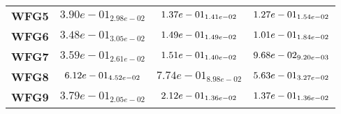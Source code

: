 \documentclass{article}
\begin{document}
\begin{table}[!htp]
\begin{scriptsize}
\begin{tabular}{c|ccc}
      \textbf{WFG5} & $3.90e-01_{2.98e-02} $ & $ \cellcolor{gray25} 1.37e-01_{1.41e-02} $ & $ \cellcolor{gray95} 1.27e-01_{1.54e-02}$ \\
      \textbf{WFG6} & $3.48e-01_{3.05e-02} $ & $ \cellcolor{gray25} 1.49e-01_{1.49e-02} $ & $ \cellcolor{gray95} 1.01e-01_{1.84e-02}$ \\
      \textbf{WFG7} & $3.59e-01_{2.61e-02} $ & $ \cellcolor{gray25} 1.51e-01_{1.40e-02} $ & $ \cellcolor{gray95} 9.68e-02_{9.20e-03}$ \\
      \textbf{WFG8} & $\cellcolor{gray25} 6.12e-01_{4.52e-02} $ & $ 7.74e-01_{8.98e-02} $ & $ \cellcolor{gray95} 5.63e-01_{3.27e-02}$ \\
      \textbf{WFG9} & $3.79e-01_{2.05e-02} $ & $ \cellcolor{gray25} 2.12e-01_{1.36e-02} $ & $ \cellcolor{gray95} 1.37e-01_{1.36e-02}$ \\
  \end{tabular}
  \end{scriptsize}
\end{table}
\end{document}
